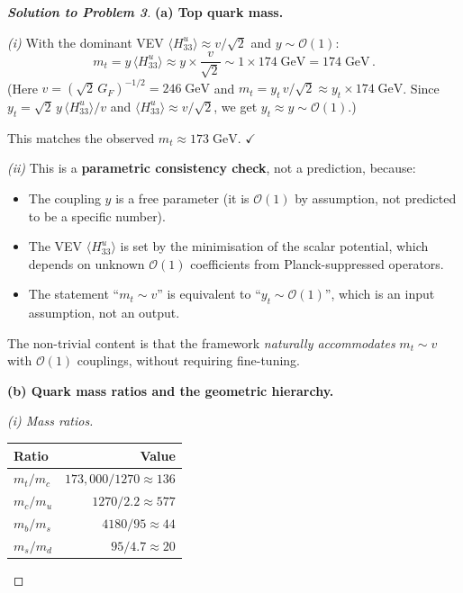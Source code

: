 \documentclass[11pt,a4paper]{article}
\begin{document}
\begin{proof}[\textbf{Solution to Problem 3}]

\textbf{(a) Top quark mass.}

\textit{(i)} With the dominant VEV
$\langle H_{33}^u \rangle \approx v/\sqrt{2}$ and $y \sim \mathcal{O}(1)$:
\[
  m_t = y\,\langle H_{33}^u \rangle \approx y \times \frac{v}{\sqrt{2}}
  \sim 1 \times 174\;\text{GeV} = 174\;\text{GeV}\,.
\]
(Here $v = (\sqrt{2}\,G_F)^{-1/2} = 246\;\text{GeV}$ and
$m_t = y_t\,v/\sqrt{2} \approx y_t \times 174\;\text{GeV}$.  Since
$y_t = \sqrt{2}\,y\,\langle H_{33}^u\rangle/v$ and
$\langle H_{33}^u\rangle \approx v/\sqrt{2}$, we get
$y_t \approx y \sim \mathcal{O}(1)$.)

This matches the observed $m_t \approx 173\;\text{GeV}$.
\quad$\checkmark$

\textit{(ii)} This is a \textbf{parametric consistency check}, not a
prediction, because:
\begin{itemize}
  \item The coupling $y$ is a free parameter (it is $\mathcal{O}(1)$
    by assumption, not predicted to be a specific number).
  \item The VEV $\langle H_{33}^u \rangle$ is set by the minimisation
    of the scalar potential, which depends on unknown
    $\mathcal{O}(1)$ coefficients from Planck-suppressed operators.
  \item The statement ``$m_t \sim v$'' is equivalent to ``$y_t \sim
    \mathcal{O}(1)$'', which is an input assumption, not an output.
\end{itemize}

The non-trivial content is that the framework \emph{naturally
accommodates} $m_t \sim v$ with $\mathcal{O}(1)$ couplings, without
requiring fine-tuning.

\bigskip

\textbf{(b) Quark mass ratios and the geometric hierarchy.}

\textit{(i) Mass ratios.}

\renewcommand{\arraystretch}{1.3}
\begin{center}
\begin{tabular}{l r}
\toprule
\textbf{Ratio} & \textbf{Value} \\
\midrule
$m_t / m_c$ & $173{,}000 / 1270 \approx 136$ \\
$m_c / m_u$ & $1270 / 2.2 \approx 577$ \\
$m_b / m_s$ & $4180 / 95 \approx 44$ \\
$m_s / m_d$ & $95 / 4.7 \approx 20$ \\
\bottomrule
\end{tabular}
\end{center}


\end{proof}
\end{document}
